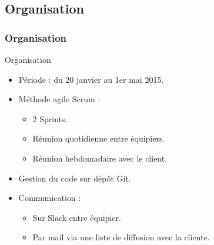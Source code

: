 \subsection{Organisation}
\begin{frame}
    \frametitle{\color{white}Organisation}
  \begin{block}{Organisation}
    \begin{itemize}
     \item Période : du 20 janvier au 1er mai 2015.
     \item Méthode agile Scrum :
     \begin{itemize}
       \item 2 Sprints.
       \item Réunion quotidienne entre équipiers.
       \item Réunion hebdomadaire avec le client.
      \end{itemize}
     \item Gestion du code sur dépôt Git.
     \item Communication :
      \begin{itemize}
       \item Sur Slack entre équipier.
       \item Par mail via une liste de diffusion avec la cliente.
      \end{itemize}

    \end{itemize}
  \end{block}
\end{frame}